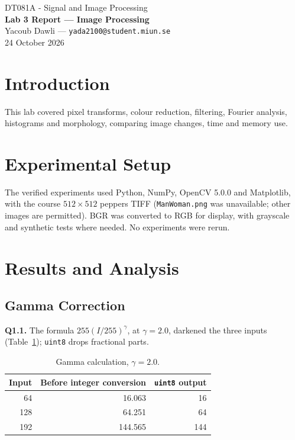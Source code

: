 \documentclass[10pt,a4paper]{article}
\begin{document}
\begin{center}
{\large DT081A - Signal and Image Processing}\\[2pt]
{\large\bfseries Lab 3 Report --- Image Processing}\\[3pt]
Yacoub Dawli --- \texttt{yada2100@student.miun.se}\\[2pt]
{\small 24 October 2026}
\end{center}
\vspace{-5pt}

\section{Introduction}
This lab covered pixel transforms, colour reduction, filtering, Fourier analysis,
histograms and morphology, comparing image changes, time and memory use.

\section{Experimental Setup}
The verified experiments used Python, NumPy, OpenCV 5.0.0 and Matplotlib,
with the course \(512\times512\) peppers TIFF (\texttt{ManWoman.png} was unavailable;
other images are permitted). BGR was converted to RGB for display, with grayscale
and synthetic tests where needed. No experiments were rerun.

\section{Results and Analysis}
\subsection{Gamma Correction}
\textbf{Q1.1.} The formula \(255(I/255)^\gamma\), at \(\gamma=2.0\), darkened the three inputs
(Table~\ref{tab:gamma}); \texttt{uint8} drops fractional parts.

\begin{table}[H]
\centering
\caption{Gamma calculation, \(\gamma=2.0\).}\label{tab:gamma}
\begin{tabular}{rrr}\toprule
Input & Before integer conversion & \texttt{uint8} output\\\midrule
64 & 16.063 & 16\\
128 & 64.251 & 64\\
192 & 144.565 & 144\\\bottomrule
\end{tabular}
\end{table}
\end{document}
